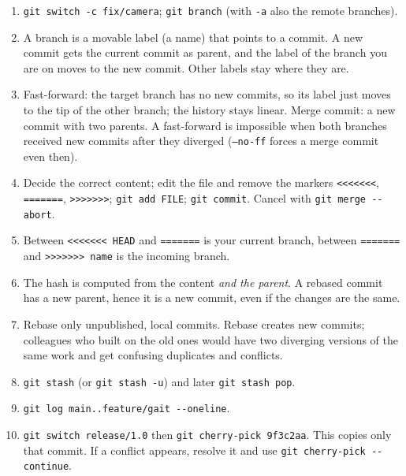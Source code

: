 \begin{enumerate}[label=\textbf{\ansnum.\arabic*}]
  \item \verb!git switch -c fix/camera!; \verb!git branch! (with \texttt{-a} also the remote branches).
  \item A branch is a movable label (a name) that points to a commit. A new commit gets the current commit as parent, and the label of the branch you are on moves to the new commit. Other labels stay where they are.
  \item Fast-forward: the target branch has no new commits, so its label just moves to the tip of the other branch; the history stays linear. Merge commit: a new commit with two parents. A fast-forward is impossible when both branches received new commits after they diverged (\texttt{--no-ff} forces a merge commit even then).
  \item Decide the correct content; edit the file and remove the markers \verb!<<<<<<<!, \verb!=======!, \verb!>>>>>>>!; \verb!git add FILE!; \verb!git commit!. Cancel with \verb!git merge --abort!.
  \item Between \verb!<<<<<<< HEAD! and \verb!=======! is your current branch, between \verb!=======! and \verb!>>>>>>> name! is the incoming branch.
  \item The hash is computed from the content \emph{and the parent}. A rebased commit has a new parent, hence it is a new commit, even if the changes are the same.
  \item Rebase only unpublished, local commits. Rebase creates new commits; colleagues who built on the old ones would have two diverging versions of the same work and get confusing duplicates and conflicts.
  \item \verb!git stash! (or \verb!git stash -u!) and later \verb!git stash pop!.
  \item \verb!git log main..feature/gait --oneline!.
  \item[\textbf{\ansnum.10}] \verb!git switch release/1.0! then \verb!git cherry-pick 9f3c2aa!. This copies only that commit. If a conflict appears, resolve it and use \verb!git cherry-pick --continue!.
\end{enumerate}
